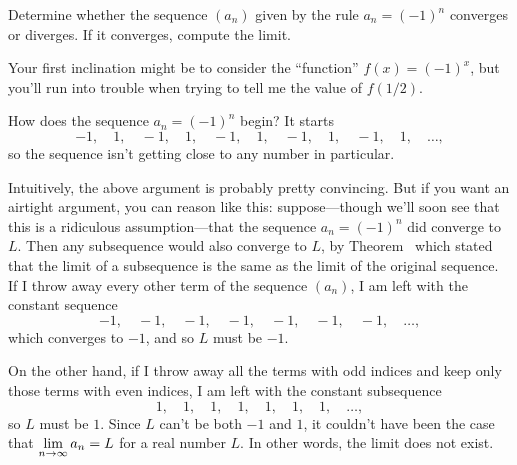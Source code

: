 
\begin{example}
\label{example:alternating-ones}
Determine whether the sequence $(a_n)$ given by the rule $a_n = (-1)^n$ converges or
diverges. If it converges, compute the limit.
\end{example}

\begin{solution}
  Your first inclination might be to consider the ``function'' $f(x) =
  (-1)^x$, but you'll run into trouble when trying to tell me the
  value of $f(1/2)$.

  How does the sequence $a_n = (-1)^n$ begin?  It starts
  $$
-1,\quad
1,\quad
-1,\quad
1,\quad
-1,\quad
1,\quad
-1,\quad
1,\quad
-1,\quad
1,\quad\ldots,
  $$
  so the sequence isn't getting close to any number in particular.

  Intuitively, the above argument is probably pretty convincing.  But
  if you want an airtight argument, you can reason like this:
  suppose---though we'll soon see that this is a ridiculous
  assumption---that the sequence $a_n = (-1)^n$ did converge to $L$.
  Then any subsequence would also converge to $L$, by
  Theorem~ which stated that the
  limit of a subsequence is the same as the limit of the original
  sequence.  If I throw away every other term of the sequence $(a_n)$,
  I am left with the constant sequence
$$
-1,\quad
-1,\quad
-1,\quad
-1,\quad
-1,\quad
-1,\quad
-1,\quad\ldots,
$$
which converges to $-1$, and so $L$ must be $-1$.

On the other hand, if I throw away all the terms with odd indices and
keep only those terms with even indices, I am left with the constant
subsequence
$$
1,\quad
1,\quad
1,\quad
1,\quad
1,\quad
1,\quad
1,\quad\ldots,
$$
so $L$ must be $1$.  Since $L$ can't be both $-1$ and $1$, it couldn't
have been the case that $\displaystyle\lim_{n \to \infty} a_n = L$ for a real
number $L$.  In other words, the limit does not exist.
\end{solution}


